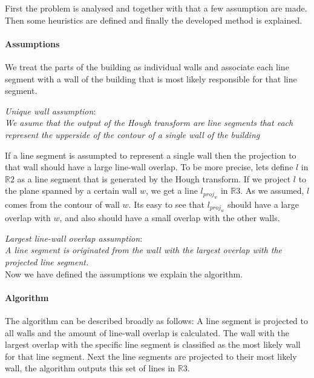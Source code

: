 \documentclass[10pt]{article}
\begin{document}
	First the problem is analysed and together with that a few assumption are made.
	Then some heuristics are defined and finally the developed method is explained.

	\paragraph{Assumptions}
	We treat the parts of the building as individual walls and associate each
	line segment with a wall of the building that is most likely responsible for
	that line segment. 

	\emph{Unique wall assumption}:\\
	\emph{We asume that the output of the Hough transform are line segments that
	each represent the upperside of the contour of a single wall of the building}



	If a line segment is assumpted to represent a single wall then the
	projection to that wall should have a large line-wall overlap. To be more
	precise, lets define $l$ in $\mathbb{R}2$ as a line segment that is generated by the Hough
	transform.  If we project $l$ to the plane spanned by a certain wall $w$, we
	get a line $l_{proj_w}$ in $\mathbb{R}3$.  As we assumed, $l$ comes from the 
	contour of wall $w$. Its easy to see that $l_{proj_w}$
	should have a large overlap with $w$, and also should have a small overlap with
	the other walls.
	
	\emph{Largest line-wall overlap assumption}:\\
	\emph{A line segment is originated from the wall with the largest overlap
	with the projected line segment.}\\

	Now we have defined the assumptions we explain the algorithm.

	\paragraph{Algorithm}
	The algorithm can be described broadly as follows:
	A line segment is projected to all walls and the amount of line-wall overlap is
	calculated. The wall with the largest overlap with the specific line
segment is classified as the most likely wall for that line segment.
	Next the line segments are projected to their most likely wall, the
	algorithm outputs this set of lines in $\mathbb{R}3$. 
	
\end{document}
